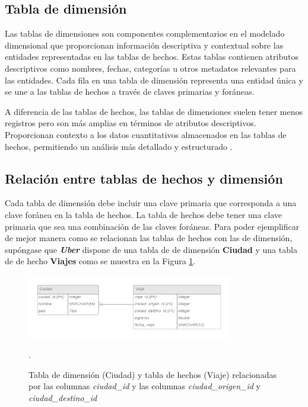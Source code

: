 \subsection{Tabla de dimensión}
Las tablas de dimensiones son componentes complementarios en el modelado dimensional que proporcionan información descriptiva y contextual sobre las entidades representadas en las tablas de hechos. Estas tablas contienen atributos descriptivos como nombres, fechas, categorías u otros metadatos relevantes para las entidades. Cada fila en una tabla de dimensión representa una entidad única y se une a las tablas de hechos a través de claves primarias y foráneas.

A diferencia de las tablas de hechos, las tablas de dimensiones suelen tener menos registros pero son más amplias en términos de atributos descriptivos. Proporcionan contexto a los datos cuantitativos almacenados en las tablas de hechos, permitiendo un análisis más detallado y estructurado \cite{schneider2012analysis} \cite{kimball2002data}.

\subsection{Relación entre tablas de hechos y dimensión}

Cada tabla de dimensión debe incluir una clave primaria que corresponda a una clave foránea en la tabla de hechos. La tabla de hechos debe tener una clave primaria que sea una combinación de las claves foráneas.
Para poder ejemplificar de mejor manera como se relacionan las tablas de hechos con las de dimensión, supóngase que \textit{\textbf{Uber}} dispone de una tabla de de dimensión \textbf{Ciudad} y una tabla de de hecho \textbf{Viajes} como se muestra en la Figura \ref{fig:modeloDimensional}.


\begin{figure}[h]
\centering
\includegraphics[width=0.8\textwidth]{images/uber_bd.png}
\caption{Tabla de dimensión (Ciudad) y tabla de hechos (Viaje) relacionadas por las columnas \textit{ciudad\_id} y las columnas \textit{ciudad\_origen\_id} y \textit{ciudad\_destino\_id}}. \label{fig:modeloDimensional}
\end{figure}

